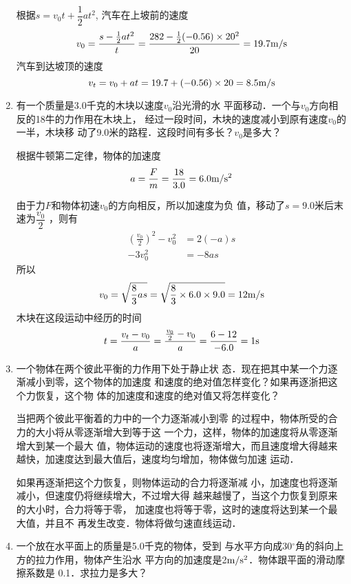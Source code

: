 \begin{enumerate}
\begin{solution}
根据$s=v_0t+\dfrac{1}{2}at^2$, 汽车在上坡前的速度
\[v_0=\frac{s-\frac{1}{2}at^2}{t}=\frac{282-\frac{1}{2}(-0.56)\times 20^2}{20}=19.7\text{m}/\text{s}\]
汽车到达坡顶的速度
\[v_t=v_0+at=19.7+(-0.56)\times20=8.5\text{m}/\text{s}\]
\end{solution}
\item  有一个质量是3.0千克的木块以速度$v_0$沿光滑的水
平面移动．一个与$v_0$方向相反的18牛的力作用在木块上，
经过一段时间，木块的速度减小到原有速度$v_0$的一半，木块移
动了9.0米的路程．这段时间有多长？$v_0$是多大？

\begin{solution}
根据牛顿第二定律，物体的加速度
\[a=\frac{F}{m}=\frac{18}{3.0}=6.0\text{m}/\text{s}^2\]

由于力$F$和物体初速$v_0$的方向相反，所以加速度为负
值，移动了$s=9.0$米后末速为$\dfrac{v_0}{2}$
，则有
\[\begin{split}
    \left(\frac{v_0}{2}\right)^2-v^2_0&=2(-a)s\\
    -3v_0^2&=-8as
\end{split}\]
所以
\[v_0=\sqrt{\frac{8}{3}as}=\sqrt{\frac{8}{3}\times 6.0\times 9.0}=12\text{m}/\text{s}\]
木块在这段运动中经历的时间
\[t=\frac{v_t-v_0}{a}=\frac{\frac{v_0}{2}-v_0}{a}=\frac{6-12}{-6.0}=1{\rm s}\]
\end{solution}
\item  一个物体在两个彼此平衡的力作用下处于静止状
态．现在把其中某一个力逐渐减小到零，这个物体的加速度
和速度的绝对值怎样变化？如果再逐浙把这个力恢复，这个物
体的加速度和速度的绝对值又将怎样变化？

\begin{solution}
    当把两个彼此平衡着的力中的一个力逐渐减小到零
的过程中，物体所受的合力的大小将从零逐渐增大到等于这
一个力，这样，物体的加速度将从零逐渐增大到某一个最大
值，物体运动的速度也将逐渐增大，而且速度增大得越来越快，加速度达到最大值后，速度均匀增加，物体做匀加速
运动．

如果再逐渐把这个力恢复，则物体运动的合力将逐渐减
小，加速度也将逐渐减小，但速度仍将继续增大，不过增大得
越来越慢了，当这个力恢复到原来的大小时，合力将等于零，
加速度也将等于零，这时的速度将达到某一个最大值，并且不
再发生改变．物体将做匀速直线运动．
\end{solution}
\item  一个放在水平面上的质量是5.0千克的物体，受到
与水平方向成30$^{\circ}$角的斜向上方的拉力作用，物体产生沿水
平方向的加速度是2$\text{m}/\text{s}^2$．物体跟平面的滑动摩擦系数是
0.1．求拉力是多大？

\begin{figure}[htp]
    \centering
{}
\end{figure}
\end{enumerate}

